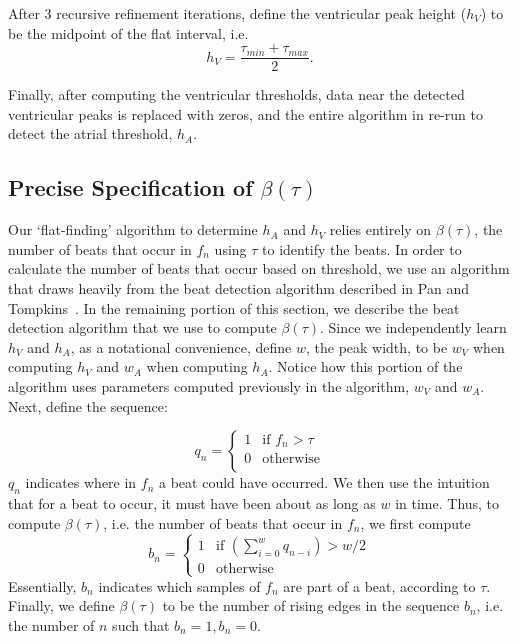 \documentclass[conference]{IEEEtran}
\newcommand{\APW}{\ensuremath{w_A}}
\newcommand{\VPW}{\ensuremath{w_V}}
\newcommand{\APH}{\ensuremath{h_A}}
\newcommand{\VPH}{\ensuremath{h_V}}
\begin{document}
After 3 recursive refinement iterations, define the ventricular peak height (\VPH{}) to be the midpoint of the flat interval, i.e.
\begin{equation*}
	\VPH{}=\frac{\tau_{min}+\tau_{max}}{2}.
\end{equation*}

Finally, after computing the ventricular thresholds,
data near the detected ventricular peaks is replaced with
zeros, and the entire algorithm in re-run to detect the
atrial threshold, \APH{}.

\subsection{Precise Specification of $\beta(\tau)$}
Our `flat-finding' algorithm to determine \APH{} and
\VPH{} relies entirely on $\beta(\tau)$, 
the number of beats that occur in $f_n$ using
$\tau$ to identify the beats. In order to calculate the
number of beats that occur based on threshold, we use
an algorithm that draws heavily from the beat
detection algorithm described in Pan and Tompkins~\cite{realtime-qrs}.
In the remaining portion of this section, we describe
the beat detection algorithm that we use to compute
$\beta(\tau)$.
Since we independently learn \VPH{} and \APH{}, as a notational convenience, define $w$, the peak width, to be \VPW{} when computing \VPH{} and \APW{} when computing \APH{}.
Notice how this portion of the algorithm uses parameters computed previously in the algorithm, \VPW{} and \APW{}.
Next, define the sequence:

\begin{equation*}
	q_n=\left\{ 
		\begin{array}{lr}
			1 & \text{if } f_n > \tau \\
			0 & \text{otherwise}\\
		\end{array}
		\right.
\end{equation*}
$q_n$ indicates where in $f_n$ a beat could
have occurred. We then use the intuition that for a beat
to occur, it must have been about as long as $w$ in time.
Thus, to compute $\beta(\tau)$, i.e. the number of
beats that occur in $f_n$, we first compute
\begin{equation*}
	b_n=\left\{ 
		\begin{array}{lc}
			1 & \text{if } \left(\sum_{i=0}^{w} q_{n-i} \right) > w/2 \\
			0 & \text{otherwise}
		\end{array}
		\right.
\end{equation*}
Essentially, $b_n$ indicates which samples of $f_n$ are part of a beat, according to $\tau$.
Finally, we define $\beta(\tau)$ to be the number of rising edges in the sequence $b_n$, 
i.e. the number of $n$ such that $b_n = 1, b_n = 0$. %
\end{document}

